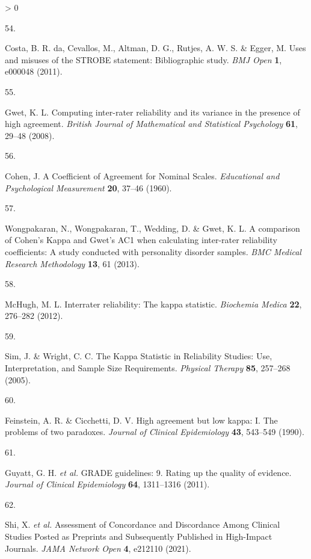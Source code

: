 \documentclass[a4paper, twoside]{templates/ociamthesis}
\newlength{\cslhangindent}
\newlength{\csllabelwidth}
\newenvironment{CSLReferences}[3] %
 {%
  \setlength{\parindent}{0pt}
  \ifodd #1 \everypar{\setlength{\hangindent}{\cslhangindent}}\ignorespaces\fi
  \ifnum #2 > 0
  \setlength{\parskip}{#2\baselineskip}
  \fi
 }%
 {}
\newcommand{\CSLLeftMargin}[1]{\parbox[t]{\maxof{\widthof{#1}}{\csllabelwidth}}{#1}}
\newcommand{\CSLRightInline}[1]{\parbox[t]{\linewidth - \csllabelwidth}{#1}}
\begin{document}
\begin{CSLReferences}{0}{0}
\leavevmode\hypertarget{ref-costa2011}{}%
\CSLLeftMargin{54. }
\CSLRightInline{Costa, B. R. da, Cevallos, M., Altman, D. G., Rutjes, A. W. S. \& Egger, M. Uses and misuses of the {STROBE} statement: Bibliographic study. \emph{BMJ Open} \textbf{1}, e000048 (2011).}

\leavevmode\hypertarget{ref-gwet2008}{}%
\CSLLeftMargin{55. }
\CSLRightInline{Gwet, K. L. Computing inter-rater reliability and its variance in the presence of high agreement. \emph{British Journal of Mathematical and Statistical Psychology} \textbf{61}, 29--48 (2008).}

\leavevmode\hypertarget{ref-cohen1960}{}%
\CSLLeftMargin{56. }
\CSLRightInline{Cohen, J. A {Coefficient} of {Agreement} for {Nominal Scales}. \emph{Educational and Psychological Measurement} \textbf{20}, 37--46 (1960).}

\leavevmode\hypertarget{ref-wongpakaran2013}{}%
\CSLLeftMargin{57. }
\CSLRightInline{Wongpakaran, N., Wongpakaran, T., Wedding, D. \& Gwet, K. L. A comparison of {Cohen}'s {Kappa} and {Gwet}'s {AC1} when calculating inter-rater reliability coefficients: A study conducted with personality disorder samples. \emph{BMC Medical Research Methodology} \textbf{13}, 61 (2013).}

\leavevmode\hypertarget{ref-mchugh2012}{}%
\CSLLeftMargin{58. }
\CSLRightInline{McHugh, M. L. Interrater reliability: The kappa statistic. \emph{Biochemia Medica} \textbf{22}, 276--282 (2012).}

\leavevmode\hypertarget{ref-sim2005}{}%
\CSLLeftMargin{59. }
\CSLRightInline{Sim, J. \& Wright, C. C. The {Kappa Statistic} in {Reliability Studies}: {Use}, {Interpretation}, and {Sample Size Requirements}. \emph{Physical Therapy} \textbf{85}, 257--268 (2005).}

\leavevmode\hypertarget{ref-feinstein1990}{}%
\CSLLeftMargin{60. }
\CSLRightInline{Feinstein, A. R. \& Cicchetti, D. V. High agreement but low kappa: {I}. {The} problems of two paradoxes. \emph{Journal of Clinical Epidemiology} \textbf{43}, 543--549 (1990).}

\leavevmode\hypertarget{ref-guyatt2011}{}%
\CSLLeftMargin{61. }
\CSLRightInline{Guyatt, G. H. \emph{et al.} {GRADE} guidelines: 9. {Rating} up the quality of evidence. \emph{Journal of Clinical Epidemiology} \textbf{64}, 1311--1316 (2011).}

\leavevmode\hypertarget{ref-shi2021}{}%
\CSLLeftMargin{62. }
\CSLRightInline{Shi, X. \emph{et al.} Assessment of {Concordance} and {Discordance Among Clinical Studies Posted} as {Preprints} and {Subsequently Published} in {High}-{Impact Journals}. \emph{JAMA Network Open} \textbf{4}, e212110 (2021).}


\end{CSLReferences}
\end{document}
